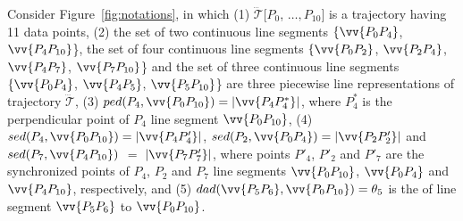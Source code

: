 \begin{example}
	\label{exm-notations}
	Consider Figure~\ref{fig:notations}, in which
	(1) $\dddot{\mathcal{T}}[P_0$, $\ldots, P_{10}]$ is a trajectory having 11 data points,
    (2) the set of two continuous line segments $\{\vv{P_0P_4}$, $\vv{P_4P_{10}}$\}, the set of four continuous line segments $\{\vv{P_0P_2}$, $\vv{P_2P_4}$, $\vv{P_4P_7}$, $\vv{P_7P_{10}}$\} and the set of three continuous line segments $\{\vv{P_0P_4}$, $\vv{P_4P_5}$, $\vv{P_5P_{10}}$\} are three piecewise line representations of trajectory $\dddot{\mathcal{T}}$,
	(3) $ped(P_4, \vv{P_0P_{10}})=|\vv{P_4P^*_4}|$, where $P^*_4$ is the perpendicular point of $P_4$ \wrt line segment $\vv{P_0P_{10}}$,
	(4) $sed(P_4, \vv{P_0P_{10}})= |\vv{P_4P'_4}|$, $sed(P_2, \vv{P_0P_{4}})= |\vv{P_2P'_2}|$ and $sed(P_7, \vv{P_4P_{10}})$ $=$ $|\vv{P_7P'_7}|$,
	where points $P'_4$, $P'_2$ and $P'_7$ are the synchronized points of $P_4$, $P_2$ and $P_7$ \wrt line segments $\vv{P_0P_{10}}$, $\vv{P_0P_{4}}$ and $\vv{P_4P_{10}}$, respectively, and
    (5) $dad(\vv{P_5P_6}, \vv{P_0P_{10}})=\theta_5$ is the \dad of line segment $\vv{P_5P_6}$ to $\vv{P_0P_{10}}$.
\end{example}





